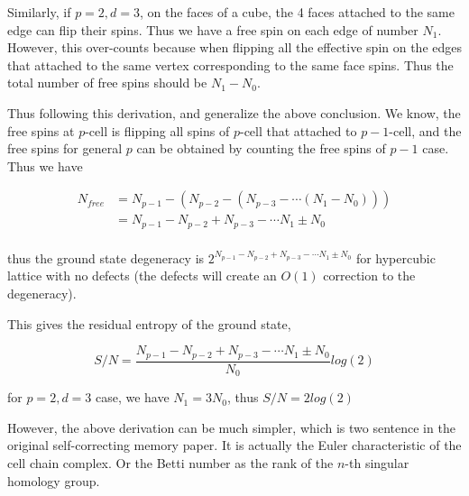 \documentclass[11pt]{article}
\begin{document}
Similarly, if $p=2, d=3$, on the faces of a cube, the 4 faces attached to the same
edge can flip their spins. Thus we have a free spin on each edge of number $N_1$.
However, this over-counts because when flipping all the effective spin on the edges that
attached to the same vertex corresponding to the same face spins. Thus the total
number of free spins should be $N_1 - N_0$.

Thus following this derivation, and generalize the above conclusion.
We know, the free spins at $p$-cell is flipping
all spins of $p$-cell that attached to $p-1$-cell,
and the free spins for general $p$ can be obtained by counting
the free spins of $p-1$ case. Thus we have

$$
\begin{aligned}
    N_{free} &= N_{p-1} - (N_{p-2} - (N_{p-3} - \cdots (N_1 - N_0)))\\
    &=N_{p-1} - N_{p-2} + N_{p-3} - \cdots N_1 \pm N_0\\
\end{aligned}
$$

thus the ground state degeneracy is $2^{N_{p-1} - N_{p-2} + N_{p-3} - \cdots N_1 \pm N_0}$
for hypercubic lattice with no defects (the defects will create an $O(1)$ correction to
the degeneracy).

This gives the residual entropy of the ground state,

$$
S/N = \frac{N_{p-1} - N_{p-2} + N_{p-3} - \cdots N_1 \pm N_0}{N_0} log(2)
$$

for $p=2,d=3$ case, we have $N_1 = 3N_0$, thus $S/N = 2log(2)$

\begin{figure}[h]
    \centering
    
\end{figure}

However, the above derivation can be much simpler, which is two sentence in the original
self-correcting memory paper\cite{hastings2014self}. It is actually the Euler characteristic
of the cell chain complex. Or the Betti number as the rank of the $n$-th singular homology
group\cite{wiki-euler-characteristic,algebra-topology-sjer}.

\end{document}
